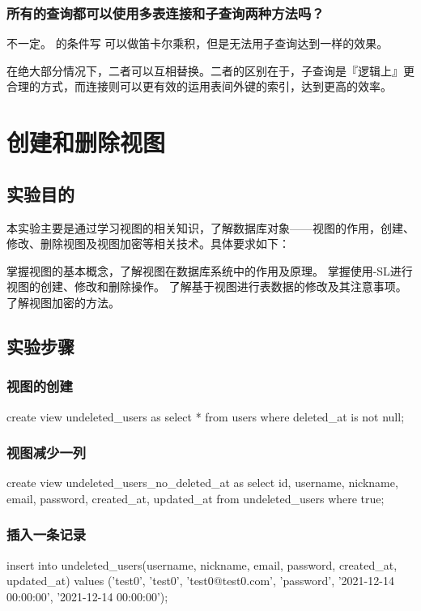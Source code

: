 \documentclass{ctexrep}
\begin{document}
\subsection*{所有的查询都可以使用多表连接和子查询两种方法吗？}
不一定。 的条件写  可以做笛卡尔乘积，但是无法用子查询达到一样的效果。

在绝大部分情况下，二者可以互相替换。二者的区别在于，子查询是『逻辑上』更合理的方式，而连接则可以更有效的运用表间外键的索引，达到更高的效率。

\chapter{创建和删除视图}
\section{实验目的}
本实验主要是通过学习视图的相关知识，了解数据库对象——视图的作用，创建、修改、删除视图及视图加密等相关技术。具体要求如下：
\begin{outline}[enumerate]
    \1 掌握视图的基本概念，了解视图在数据库系统中的作用及原理。
    \1 掌握使用-SL进行视图的创建、修改和删除操作。
    \1 了解基于视图进行表数据的修改及其注意事项。
    \1 了解视图加密的方法。
\end{outline}
\section{实验步骤}
\subsection{视图的创建}
\begin{run}
    create view undeleted_users as select * from users where deleted_at is not null;
\end{run}
\subsection{视图减少一列}
\begin{run}
    create view undeleted_users_no_deleted_at as select id, username, nickname, email, password, created_at, updated_at from undeleted_users where true;
\end{run}
\subsection{插入一条记录}
\begin{run}
    insert into undeleted_users(username, nickname, email, password,  created_at, updated_at)
    values ('test0', 'test0', 'test0@test0.com', 'password',  '2021-12-14 00:00:00', '2021-12-14 00:00:00');
\end{run}
\end{document}
